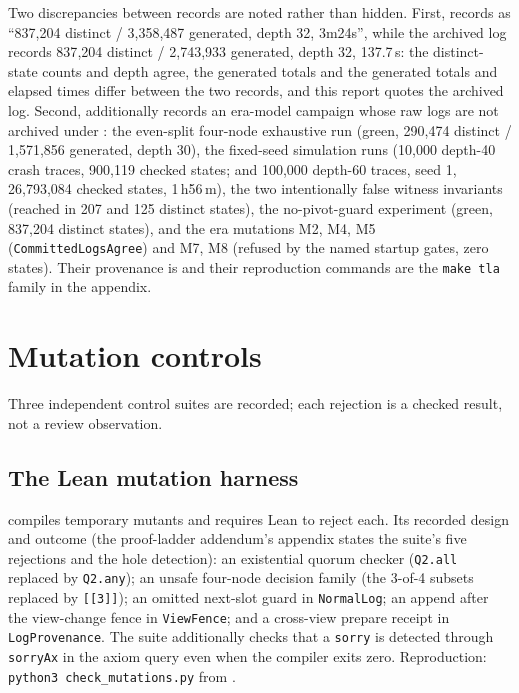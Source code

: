 \documentclass[10pt,journal,letterpaper]{IEEEtran}
\newcommand{\code}[1]{\texttt{#1}}
\begin{document}
Two discrepancies between records are noted rather than hidden. First,
 records  as
``837{,}204 distinct / 3{,}358{,}487 generated, depth 32, 3m24s'', while the
archived log records 837{,}204 distinct / 2{,}743{,}933 generated, depth 32,
137.7\,s: the distinct-state counts and depth agree, the generated totals and
the generated totals and elapsed times differ between the two records, and
this report quotes the archived
log. Second,  additionally records an era-model campaign
whose raw logs are not archived under : the even-split
four-node exhaustive run (green, 290{,}474 distinct / 1{,}571{,}856 generated,
depth 30), the fixed-seed simulation runs (10{,}000 depth-40 crash traces,
900{,}119 checked states; and 100{,}000 depth-60 traces, seed 1,
26{,}793{,}084 checked states, 1\,h56\,m), the two intentionally false
witness invariants (reached in 207 and 125 distinct states), the
no-pivot-guard experiment (green, 837{,}204 distinct states), and the era
mutations M2, M4, M5 (\code{CommittedLogsAgree}) and M7, M8 (refused by the
named startup gates, zero states). Their provenance is
 and their reproduction commands are the
\code{make tla} family in the appendix.

\section{Mutation controls}\label{sec:mutations}
Three independent control suites are recorded; each rejection is a checked
result, not a review observation.

\subsection{The Lean mutation harness}
 compiles temporary mutants and
requires Lean to reject each. Its recorded design and outcome
(the proof-ladder addendum's appendix states the suite's five rejections and
the hole detection):
an existential quorum checker (\code{Q2.all} replaced by \code{Q2.any}); an
unsafe four-node decision family (the 3-of-4 subsets replaced by
\code{[[3]]}); an omitted next-slot guard in \code{NormalLog}; an append
after the view-change fence in \code{ViewFence}; and a cross-view prepare
receipt in \code{LogProvenance}. The suite additionally checks that a
\code{sorry} is detected through \code{sorryAx} in the axiom query even when
the compiler exits zero. Reproduction: \code{python3 check\_mutations.py} from
.
\end{document}
